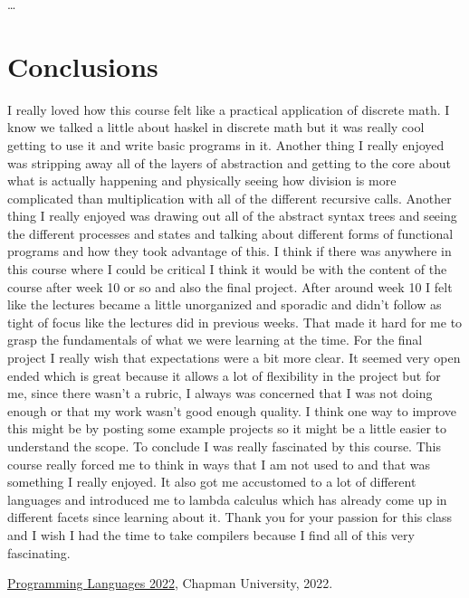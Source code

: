 \documentclass{article}
\theoremstyle{theorem}
\theoremstyle{definition}
\theoremstyle{remark}
\begin{document}
\ldots

\section{Conclusions}\label{conclusions}

I really loved how this course felt like a practical application of discrete math. I know we talked a little about haskel in discrete math but it was really cool getting to use it and write basic programs in it. Another thing I really enjoyed was stripping away all of the layers of abstraction and getting to the core about what is actually happening and physically seeing how division is more complicated than multiplication with all of the different recursive calls. Another thing I really enjoyed was drawing out all of the abstract syntax trees and seeing the different processes and states and talking about different forms of functional programs and how they took advantage of this. I think if there was anywhere in this course where I could be critical I think it would be with the content of the course after week 10 or so and also the final project. After around week 10 I felt like the lectures became a little unorganized and sporadic and didn’t follow as tight of focus like the lectures did in previous weeks. That made it hard for me to grasp the fundamentals of what we were learning at the time. For the final project I really wish that expectations were a bit more clear. It seemed very open ended which is great because it allows a lot of flexibility in the project but for me, since there wasn’t a rubric, I always was concerned that I was not doing enough or that my work wasn’t good enough quality. I think one way to improve this might be by posting some example projects so it might be a little easier to understand the scope.  To conclude I was really fascinated by this course. This course really forced me to think in ways that I am not used to and that was something I really enjoyed. It also got me accustomed to a lot of different languages and introduced me to lambda calculus which has already come up in different facets since learning about it. Thank you for your passion for this class and I wish I had the time to take compilers because I find all of this very fascinating.

\begin{thebibliography}{99}
 \href{https://github.com/alexhkurz/programming-languages-2022/blob/main/README.md}{Programming Languages 2022}, Chapman University, 2022.
\end{thebibliography}
\end{document}
